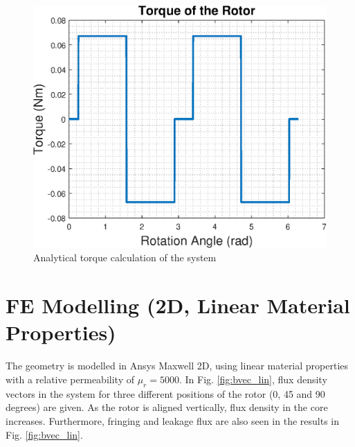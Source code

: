 \documentclass{reportClass}
\begin{document}
\begin{figure}[h!]
\centering
\includegraphics[width=0.6\linewidth]{torque_analytical.eps}
\caption{Analytical torque calculation of the system}
\label{fig:torque_an}
\end{figure}



\section{FE Modelling (2D, Linear Material Properties)}

The geometry is modelled in Ansys Maxwell 2D, using linear material properties with a relative permeability of $\mu_r = 5000$. In Fig. \ref{fig:bvec_lin}, flux density vectors in the system for three different positions of the rotor (0, 45 and 90 degrees) are given. As the rotor is aligned vertically, flux density in the core increases. Furthermore, fringing and leakage flux are also seen in the results in Fig. \ref{fig:bvec_lin}. 
\end{document}
